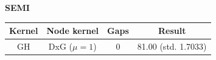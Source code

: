 \documentclass{article}
\begin{document}
\textbf{SEMI}\\
\begin{minipage}{0.6\linewidth}
	\hspace*{-1in}

	\label{fig:semi}
\end{minipage}
\begin{minipage}[c]{0.5\linewidth}	
	\centering
	\begin{tabular}{c|c|c|c}
		Kernel & Node kernel & Gaps & Result\\
		\hline
		GH & DxG ($\mu=1$) & 0 & 81.00 (std. 1.7033)
	\end{tabular}
	\label{table:semi}
\end{minipage}
\end{document}
